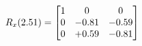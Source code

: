 \documentclass[preview]{standalone}
\begin{document}
\begin{align*}
\special{dvisvgm:raw <g id='unique000'>}R_{x}(2.51) = \begin{bmatrix}1 & 0 & 0 \\0 & -0.81 & -0.59 \\0 & +0.59 & -0.81\end{bmatrix}\special{dvisvgm:raw </g>}
\end{align*}
\end{document}
